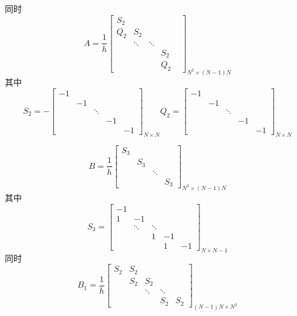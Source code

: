 \documentclass{article}
\begin{document}
同时\begin{equation*}
	A=\frac{1}{h}	\begin{bmatrix}
		S_2&  &  & \\ 
		Q_2& S_2 &  & \\ 
		& \ddots &\ddots & \\ 
		& & & S_2&\\
		&  & & Q_2
	\end{bmatrix}_{N^2\times (N-1)N}
\end{equation*}
其中\begin{equation*}
S_2=-\begin{bmatrix}
	-1&  &  &  & \\ 
	&  -1&  &  & \\ 
	& & \ddots &  & \\ 
	&  & & -1 & \\ 
	&  &  &  & -1
\end{bmatrix}_{N\times N}	Q_2=\begin{bmatrix}
-1&  &  &  & \\ 
&  -1&  &  & \\ 
& & \ddots &  & \\ 
&  & & -1 & \\ 
&  &  &  & -1
\end{bmatrix}_{N\times N}
\end{equation*}

\begin{equation*}
	B=\frac{1}{h}	\begin{bmatrix}
		S_3&  &  & \\ 
		& S_3 &  & \\ 
		&  &\ddots  & \\ 
		&  &  & S_3
	\end{bmatrix}_{N^2\times (N-1)N}
\end{equation*}
其中\begin{equation*}
	S_3=\begin{bmatrix}
		-1&  &  &  & \\ 
		1&  -1&  &  & \\ 
		& \ddots& \ddots &  & \\ 
		&  & 1& -1 & \\ 
		&  &  & 1 & -1
	\end{bmatrix}_{N\times N-1}
\end{equation*}
同时
\begin{equation*}
	B_1=\frac{1}{h}\begin{bmatrix}
		S_2 &S_2  &  &  & \\ 
		&  S_2& S_2 &  & \\ 
		&  &  \ddots& \ddots & \\ 
		&  &  & S_2 & S_2
	\end{bmatrix}_{(N-1)N\times N^2}
\end{equation*}
\end{document}
